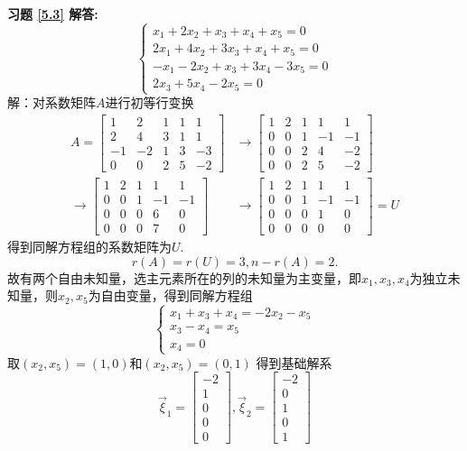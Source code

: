 \documentclass[a4paper]{book}
\begin{document}
\textbf{习题 \ref{5.3} 解答:}\\
\begin{equation*}
\begin{cases}
x_1+2x_2+ x_3+x_4+ x_5=0\\
2x_1+4x_2+3x_3+x_4+ x_5=0\\
-x_1-2x_2+ x_3+3x_4-3x_5=0\\
2x_3+5x_4-2x_5=0
\end{cases}
\end{equation*}
解：对系数矩阵$A$进行初等行变换
\begin{align*}
A= \begin{bmatrix}1&2&1&1&1\\2&4&3&1&1\\-1&-2&1&3&-3\\0&0&2&5&-2\end{bmatrix} &
   \rightarrow
   \begin{bmatrix}1&2&1&1&1\\0&0&1&-1&-1\\0&0&2&4&-2\\0&0&2&5&-2\end{bmatrix} \\
   \rightarrow
   \begin{bmatrix}1&2&1&1&1\\0&0&1&-1&-1\\0&0&0&6&0\\0&0&0&7&0\end{bmatrix} &
   \rightarrow
   \begin{bmatrix}1&2&1&1&1\\0&0&1&-1&-1\\0&0&0&1&0\\0&0&0&0&0\end{bmatrix}=U
\end{align*}
得到同解方程组的系数矩阵为$U$.
\begin{equation*}
  r(A)=r(U)=3,n-r(A)=2.
\end{equation*}
故有两个自由未知量，选主元素所在的列的未知量为主变量，即$x_1,x_3,x_4$为独立未知量，则$x_2,x_5$为自由变量，得到同解方程组
\begin{equation*}
\begin{cases}
x_1+x_3+x_4=-2x_2-x_5\\
   x_3-x_4=x_5       \\
   x_4=0
\end{cases}
\end{equation*}
取$(x_2,x_5)=(1,0)$和$(x_2,x_5)=(0,1)$ 得到基础解系
\begin{equation*}
\vec{\xi}_1=\begin{bmatrix}-2\\1\\0\\0\\0\end{bmatrix},
\vec{\xi}_2=\begin{bmatrix}-2\\0\\1\\0\\1\end{bmatrix}
\end{equation*}
\end{document}
